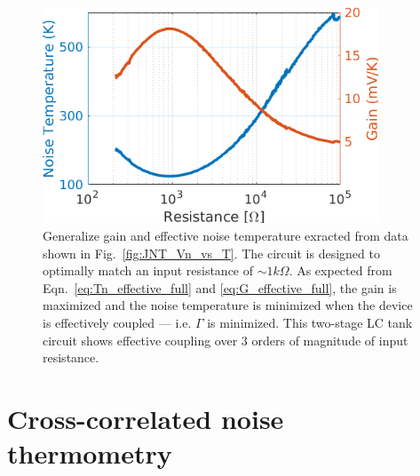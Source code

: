 \begin{figure}
\centering
\includegraphics[width = 100mm]{figures/Johnson_noise_thermometry/G_Tn_vs_R}
\caption{Generalize gain and effective noise temperature exracted from data shown in Fig.~\ref{fig:JNT_Vn_vs_T}. The circuit is designed to optimally match an input resistance of ${\sim}1k\Omega$. As expected from Eqn.~\ref{eq:Tn_effective_full} and \ref{eq:G_effective_full}, the gain is maximized and the noise temperature is minimized when the device is effectively coupled --- i.e. $\Gamma$ is minimized. This two-stage LC tank circuit shows effective coupling over $3$ orders of magnitude of input resistance.}
\label{fig:JNT_G_Tn_vs_R}
\end{figure}


\section{Cross-correlated noise thermometry}

